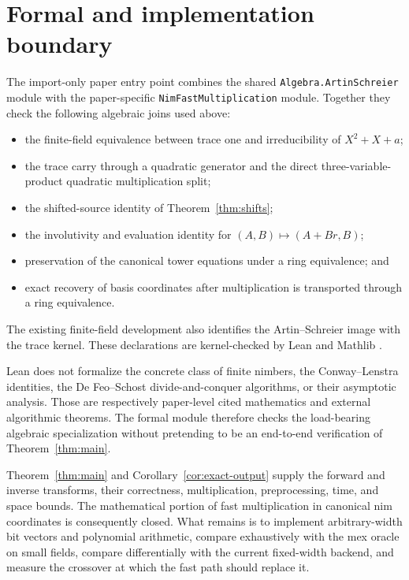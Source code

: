 \documentclass[11pt]{article}
\theoremstyle{definition}
\theoremstyle{remark}
\begin{document}
\section{Formal and implementation boundary}

The import-only paper entry point combines the shared
\texttt{Algebra.ArtinSchreier} module with the paper-specific
\texttt{NimFastMultiplication} module.  Together they check the following
algebraic joins used above:
\begin{itemize}
\item the finite-field equivalence between trace one and irreducibility of
  $X^2+X+a$;
\item the trace carry through a quadratic generator and the direct
  three-variable-product quadratic multiplication split;
\item the shifted-source identity of Theorem~\ref{thm:shifts};
\item the involutivity and evaluation identity for
  $(A,B)\mapsto(A+Br,B)$;
\item preservation of the canonical tower equations under a ring
  equivalence; and
\item exact recovery of basis coordinates after multiplication is transported
  through a ring equivalence.
\end{itemize}
The existing finite-field development also identifies the Artin--Schreier
image with the trace kernel.  These declarations are kernel-checked by Lean
and Mathlib \cite{demouraullrich2021,mathlib2020}.

Lean does not formalize the concrete class of finite nimbers, the
Conway--Lenstra identities, the De Feo--Schost divide-and-conquer algorithms,
or their asymptotic analysis.  Those are respectively paper-level cited
mathematics and external algorithmic theorems.  The formal module therefore
checks the load-bearing algebraic specialization without pretending to be an
end-to-end verification of Theorem~\ref{thm:main}.

Theorem~\ref{thm:main} and Corollary~\ref{cor:exact-output} supply the forward
and inverse transforms, their correctness, multiplication, preprocessing,
time, and space bounds.  The mathematical portion of fast multiplication in
canonical nim coordinates is consequently closed.  What remains is to
implement arbitrary-width bit vectors and polynomial arithmetic, compare
exhaustively with the mex oracle on small fields, compare differentially with
the current fixed-width backend, and measure the crossover at which the fast
path should replace it.

\clearpage
\small


\end{document}
